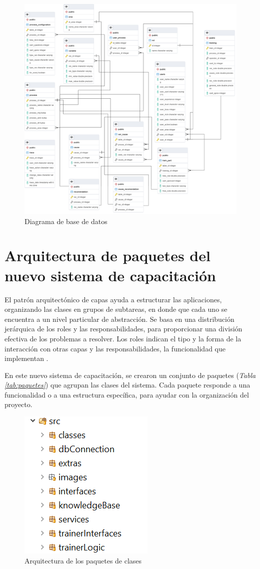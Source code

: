 \begin{figure}[H]
\centering
 \includegraphics[width=0.9\linewidth]{imagen/bd.png}
 \caption{Diagrama de base de datos}
 \label{fig:bd} 
\end{figure}

\section{Arquitectura de paquetes del nuevo sistema de capacitación}
El patrón arquitectónico de capas ayuda a estructurar las aplicaciones, organizando las clases en grupos de subtareas, en donde que cada uno se encuentra a un nivel particular de abstracción. Se basa en una distribución jerárquica de los roles y las responsabilidades, para proporcionar una división efectiva de los problemas a resolver. Los roles indican el tipo y la forma de la interacción con otras capas y las responsabilidades, la funcionalidad que implementan \cite{Plecka2013}.

En este nuevo sistema de capacitación, se crearon un conjunto de paquetes  (\textsl{Tabla \ref{tab:paquetes}})  que agrupan las clases del sistema. Cada paquete responde a una funcionalidad o a una estructura específica, para ayudar con la organización del proyecto.

\begin{figure}[H]
\centering
 \includegraphics[width=0.27\linewidth]{imagen/paquetes.png}
 \caption{Arquitectura de los paquetes de clases}
 \label{fig:paquetes} 
\end{figure}

